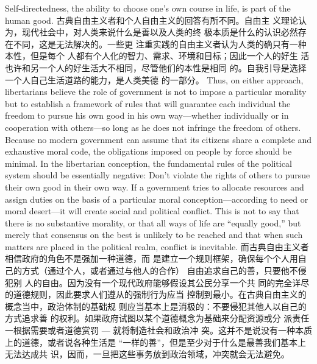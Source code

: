 \begin{paracol}{2}
Self-directedness, the ability to choose one's own course in life,
is part of the human good.
\switchcolumn
古典自由主义者和个人自由主义的回答有所不同。自由主
义理论认为，现代社会中，对人类来说什么是善以及人类的终
极本质是什么的认识必然存在不同，这是无法解决的。一些更
注重实践的自由主义者认为人类的确只有一种本性，但是每个
人都有个人化的智力、需求、环境和目标；因此一个人的好生
活也许和另一个人的好生活大不相同，尽管他们的本性是相同
的。自我引导是选择一个人自己生活道路的能力，是人类美德
的一部分。
\switchcolumn*
Thus, on either approach, libertarians believe the role of government is not to impose a particular morality but to establish a
framework of rules that will guarantee each individual the freedom to pursue his own good in his own way---whether individually or in cooperation with others---so long as he does not
infringe the freedom of others. Because no modern government
can assume that its citizens share a complete and exhaustive
moral code, the obligations imposed on people by force should
be minimal. In the libertarian conception, the fundamental
rules of the political system should be essentially negative:
Don't violate the rights of others to pursue their own good in
their own way. If a government tries to allocate resources and
assign duties on the basis of a particular moral conception---according to need or moral desert---it will create social and political conflict. This is not to say that there is no substantive
morality, or that all ways of life are ``equally good,'' but merely
that consensus on the best is unlikely to be reached and that
when such matters are placed in the political realm, conflict is
inevitable.
\switchcolumn
而古典自由主义者相信政府的角色不是强加一种道德，而
是建立一个规则框架，确保每个个人用自己的方式（通过个人，或者通过与他人的合作） 自由追求自己的善，只要他不侵犯别
人的自由。因为没有一个现代政府能够假设其公民分享一个共
同的完全详尽的道德规则，因此要求人们遵从的强制行为应当
控制到最小。在古典自由主义的概念当中，政治体制的基础规
则应当基本上是消极的：不要侵犯其他人以自己的方式追求善
的权利。如果政府试图以某个道德概念为基础来分配资源或分
派责任一根据需要或者道德赏罚 --- 就将制造社会和政治冲
突。这并不是说没有一种本质上的道德，或者说各种生活是
“一样的善”，但是至少对于什么是最善我们基本上无法达成共
识，因而，一旦把这些事务放到政治领域，冲突就会无法避免。


\end{paracol}
